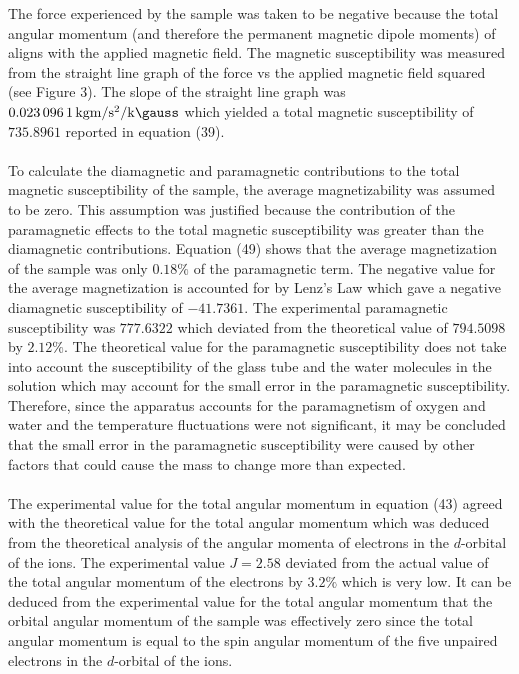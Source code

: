 \documentclass[a4paper,11pt]{article}
\begin{document}
The force experienced by the sample was taken to be negative because the total angular momentum (and therefore the permanent magnetic dipole moments) of  aligns with the applied magnetic field. The magnetic susceptibility was measured from the straight line graph of the force vs the applied magnetic field squared (see Figure 3). The slope of the straight line graph was $\SI{0.0230961}{\kilogram\meter\per\square\second\per\kilo\gauss}$ which yielded a total magnetic susceptibility of $735.8961$ reported in equation (39).\\
\\
To calculate the diamagnetic and paramagnetic contributions to the total magnetic susceptibility of the sample, the average magnetizability was assumed to be zero. This assumption was justified because the contribution of the paramagnetic effects to the total magnetic susceptibility was greater than the diamagnetic contributions. Equation (49) shows that the average magnetization of the sample was only $0.18\%$ of the paramagnetic term. The negative value for the average magnetization is accounted for by Lenz's Law which gave a negative diamagnetic susceptibility of $-41.7361$. The experimental paramagnetic susceptibility was $777.6322$ which deviated from the theoretical value of $794.5098$ by $2.12\%$. The theoretical value for the paramagnetic susceptibility does not take into account the susceptibility of the glass tube and the water molecules in the solution which may account for the small error in the paramagnetic susceptibility. Therefore, since the apparatus accounts for the paramagnetism of oxygen and water and the temperature fluctuations were not significant, it may be concluded that the small error in the paramagnetic susceptibility were caused by other factors that could cause the mass to change more than expected.\\
\\
The experimental value for the total angular momentum in equation (43) agreed with the theoretical value for the total angular momentum which was deduced from the theoretical analysis of the angular momenta of electrons in the $d$-orbital of the  ions. The experimental value $J=2.58$ deviated from the actual value of the total angular momentum of the electrons by $3.2\%$ which is very low. It can be deduced from the experimental value for the total angular momentum that the orbital angular momentum of the sample was effectively zero since the total angular momentum is equal to the spin angular momentum of the five unpaired electrons in the $d$-orbital of the  ions. 
\end{document}
